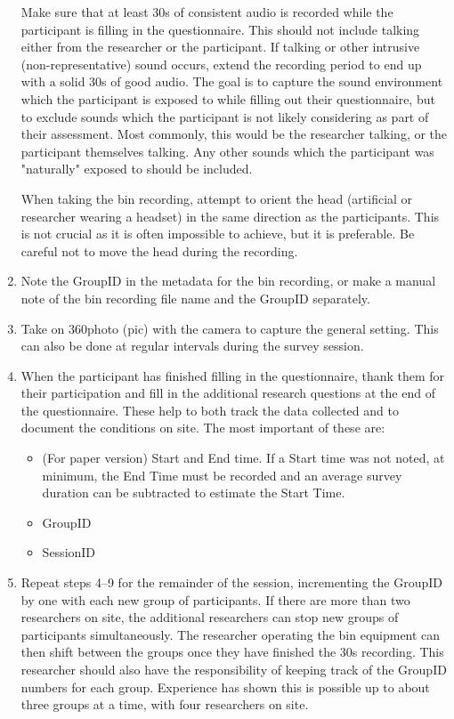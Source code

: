\begin{enumerate}
           Make sure that at least 30s of consistent audio is recorded while the participant is filling in the questionnaire. This should not include talking either from the researcher or the participant. If talking or other intrusive (non-representative) sound occurs, extend the recording period to end up with a solid 30s of good audio. The goal is to capture the sound environment which the participant is exposed to while filling out their questionnaire, but to exclude sounds which the participant is not likely considering as part of their assessment. Most commonly, this would be the researcher talking, or the participant themselves talking. Any other sounds which the participant was "naturally" exposed to should be included.

           When taking the \gls{bin} recording, attempt to orient the head (artificial or researcher wearing a headset) in the same direction as the participants. This is not crucial as it is often impossible to achieve, but it is preferable. Be careful not to move the head during the recording.
     \item Note the GroupID in the metadata for the \gls{bin} recording, or make a manual note of the \gls{bin} recording file name and the GroupID separately.
     \item Take on 360\degree photo (\gls{pic}) with the camera to capture the general setting. This can also be done at regular intervals during the survey session.
     \item When the participant has finished filling in the questionnaire, thank them for their participation and fill in the additional research questions at the end of the questionnaire. These help to both track the data collected and to document the conditions on site. The most important of these are:
           \begin{itemize}
             \item (For paper version) Start and End time. If a Start time was not noted, at minimum, the End Time must be recorded and an average survey duration can be subtracted to estimate the Start Time.
             \item GroupID
             \item SessionID
           \end{itemize}
     \item Repeat steps 4--9 for the remainder of the session, incrementing the GroupID by one with each new group of participants. If there are more than two researchers on site, the additional researchers can stop new groups of participants simultaneously. The researcher operating the \gls{bin} equipment can then shift between the groups once they have finished the 30s recording. This researcher should also have the responsibility of keeping track of the GroupID numbers for each group. Experience has shown this is possible up to about three groups at a time, with four researchers on site.

\end{enumerate}
